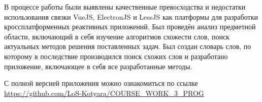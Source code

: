 \conclusion

В процессе работы были выявлены качественные превосходства и недостатки использования связки VueJS, ElectronJS и LessJS как платформы для разработки кроссплатформенных реактивных приложений. Был проведён анализ предметной области, включающий в себя изучение алгоритмов схожести слов, поиск актуальных методов решения поставленных задач. Был создан словарь слов, по которому в последствие производился поиск схожих слов и разработано приложение, включающее в себя все разработанные методы.

С полной версией приложения можно ознакомиться по ссылке \url{https://github.com/LoS-Kotyara/COURSE_WORK_3_PROG}